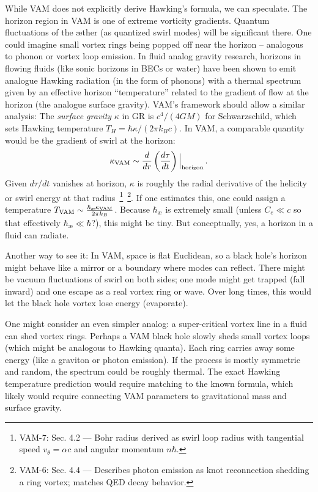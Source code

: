 \documentclass[a4paper,12pt]{article}
\begin{document}
    While VAM does not explicitly derive Hawking’s formula, we can speculate. The horizon region in VAM is one of extreme vorticity gradients. Quantum fluctuations of the æther (as quantized swirl modes) will be significant there. One could imagine small vortex rings being popped off near the horizon – analogous to phonon or vortex loop emission. In fluid analog gravity research, horizons in flowing fluids (like sonic horizons in BECs or water) have been shown to emit analogue Hawking radiation (in the form of phonons) with a thermal spectrum given by an effective horizon “temperature” related to the gradient of flow at the horizon (the analogue surface gravity). VAM’s framework should allow a similar analysis: The \emph{surface gravity} $\kappa$ in GR is $c^4/(4GM)$ for Schwarzschild, which sets Hawking temperature $T_H = \hbar \kappa/(2\pi k_B c)$. In VAM, a comparable quantity would be the gradient of swirl at the horizon:
    \[
        \kappa_{\rm VAM} \sim \frac{d}{dr}\left(\frac{d\tau}{dt}\right) \Big|_{\rm horizon}\,.
    \]
    Given $d\tau/dt$ vanishes at horizon, $\kappa$ is roughly the radial derivative of the helicity or swirl energy at that radius~\footnote{VAM-7: Sec. 4.2 — Bohr radius derived as swirl loop radius with tangential speed $v_\theta = \alpha c$ and angular momentum $n\hbar$.}~\footnote{VAM-6: Sec. 4.4 — Describes photon emission as knot reconnection shedding a ring vortex; matches QED decay behavior.}. If one estimates this, one could assign a temperature $T_{\rm VAM} \sim \frac{\hbar_{\text{\ae}} \kappa_{\rm VAM}}{2\pi k_B}$. Because $\hbar_{\text{\ae}}$ is extremely small (unless $C_e \ll c$ so that effectively $\hbar_{\text{\ae}} \ll \hbar$?), this might be tiny. But conceptually, yes, a horizon in a fluid can radiate.

    Another way to see it: In VAM, space is flat Euclidean, so a black hole’s horizon might behave like a mirror or a boundary where modes can reflect. There might be vacuum fluctuations of swirl on both sides; one mode might get trapped (fall inward) and one escape as a real vortex ring or wave. Over long times, this would let the black hole vortex lose energy (evaporate).

    One might consider an even simpler analog: a super-critical vortex line in a fluid can shed vortex rings. Perhaps a VAM black hole slowly sheds small vortex loops (which might be analogous to Hawking quanta). Each ring carries away some energy (like a graviton or photon emission). If the process is mostly symmetric and random, the spectrum could be roughly thermal. The exact Hawking temperature prediction would require matching to the known formula, which likely would require connecting VAM parameters to gravitational mass and surface gravity.
\end{document}
